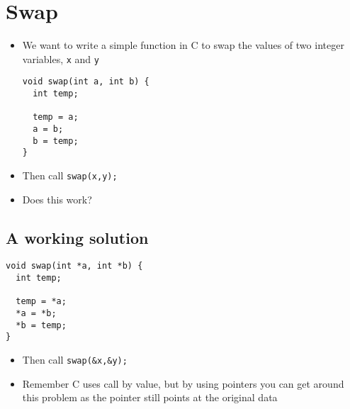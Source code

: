 \documentclass{article}
\begin{document}
\section{Swap}
\begin{itemize}
\item We want to write a simple function in C to swap the values of two integer variables, \verb!x! and \verb!y!

\begin{verbatim}
void swap(int a, int b) {
  int temp;
  
  temp = a;
  a = b;
  b = temp;
}
\end{verbatim}

\item Then call \verb!swap(x,y);!
\item Does this work?
\end{itemize}



\subsection{A working solution}
\begin{verbatim}
void swap(int *a, int *b) {
  int temp;
  
  temp = *a;
  *a = *b;
  *b = temp;
}
\end{verbatim}

\begin{itemize}
\item Then call \verb!swap(&x,&y);!
\item Remember C uses call by value, but by using pointers you can get around this problem as the pointer still points at the original data
\end{itemize}
\end{document}

